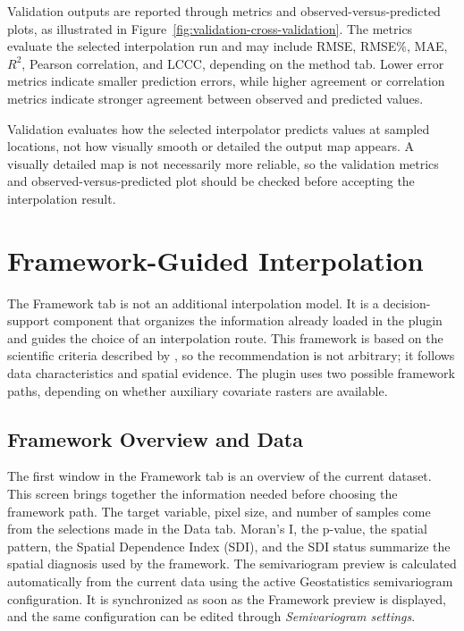 \documentclass[11pt,a4paper]{article}
\begin{document}
Validation outputs are reported through metrics and observed-versus-predicted plots, as illustrated in Figure~\ref{fig:validation-cross-validation}. The metrics evaluate the selected interpolation run and may include RMSE, RMSE\%, MAE, $R^2$, Pearson correlation, and LCCC, depending on the method tab. Lower error metrics indicate smaller prediction errors, while higher agreement or correlation metrics indicate stronger agreement between observed and predicted values.


\begin{infobox}
Validation evaluates how the selected interpolator predicts values at sampled locations, not how visually smooth or detailed the output map appears. A visually detailed map is not necessarily more reliable, so the validation metrics and observed-versus-predicted plot should be checked before accepting the interpolation result.
\end{infobox}


\section{Framework-Guided Interpolation}

The Framework tab is not an additional interpolation model. It is a decision-support component that organizes the information already loaded in the plugin and guides the choice of an interpolation route. This framework is based on the scientific criteria described by \cite{delgadobejarano2026}, so the recommendation is not arbitrary; it follows data characteristics and spatial evidence. The plugin uses two possible framework paths, depending on whether auxiliary covariate rasters are available.

\subsection{Framework Overview and Data}

The first window in the Framework tab is an overview of the current dataset. This screen brings together the information needed before choosing the framework path. The target variable, pixel size, and number of samples come from the selections made in the Data tab. Moran's I, the p-value, the spatial pattern, the Spatial Dependence Index (SDI), and the SDI status summarize the spatial diagnosis used by the framework. The semivariogram preview is calculated automatically from the current data using the active Geostatistics semivariogram configuration. It is synchronized as soon as the Framework preview is displayed, and the same configuration can be edited through \textit{Semivariogram settings}.
\end{document}
